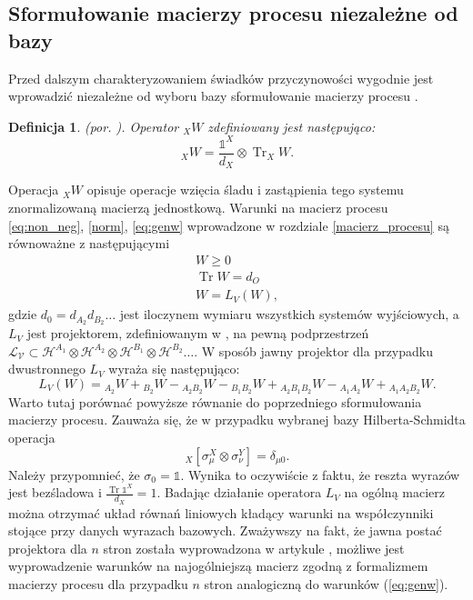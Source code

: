 \documentclass[10pt]{article} %
\newtheorem{definicja}{Definicja}
\DeclareMathOperator{\Trs}{Tr}
\newcommand{\Hx}[1]{\mathcal{H}^{#1}}
\newcommand{\I}{\mathbb{1}}
\begin{document}
\subsection{Sformułowanie macierzy procesu niezależne od bazy}
Przed dalszym charakteryzowaniem świadków przyczynowości wygodnie jest wprowadzić niezależne od wyboru bazy sformułowanie macierzy procesu \cite{causal_witness}.
\begin{definicja}
(por. \cite{causal_witness}).
Operator ${}_XW$ zdefiniowany jest następująco:
\begin{equation}
{}_X W = \frac{\I^X}{d_X} \otimes \Trs_X W.
\end{equation}
\end{definicja}
Operacja ${}_XW$ opisuje operacje wzięcia śladu i zastąpienia tego systemu znormalizowaną macierzą jednostkową.
Warunki na macierz procesu \eqref{eq:non_neg}, \eqref{norm}, \eqref{eq:genw} wprowadzone w rozdziale \ref{macierz_procesu} są równoważne z następującymi
\begin{gather}
W \geq 0 \\
\Trs W = d_O \\
W = L_V\left(W\right),
\end{gather}
gdzie $d_0 = d_{A_2} d_{B_2} \dots$ jest iloczynem wymiaru wszystkich systemów wyjściowych, a $L_V$ jest projektorem, zdefiniowanym w \cite{causal_witness}, na pewną podprzestrzeń 
$\mathcal{L_V} \subset \Hx{A_1} \otimes \Hx{A_2} \otimes \Hx{B_1} \otimes \Hx{B_2} \dots$.
W sposób jawny projektor dla przypadku dwustronnego $L_V$ wyraża się następująco:
\begin{equation}
\label{eq:projec2}
L_V(W) = {}_{A_2}W + {}_{B_2}W - {}_{A_2B_2}W - {}_{B_1B_2}W + {}_{A_2B_1B_2}W - {}_{A_1A_2}W + {}_{A_1A_2B_2}W.
\end{equation}
Warto tutaj porównać powyższe równanie do poprzedniego sformułowania macierzy procesu. Zauważa się, że w przypadku wybranej bazy Hilberta-Schmidta
operacja
\begin{equation}
{}_X\left[\sigma_\mu^X \otimes \sigma_\nu^Y\right] = \delta_{\mu0}.
\end{equation}
Należy przypomnieć, że $\sigma_0 = \I$.
Wynika to oczywiście z faktu, że reszta wyrazów jest bezśladowa i $\frac{\Trs \I^X}{d_X} = 1$. Badając działanie operatora $L_V$ na ogólną macierz można otrzymać układ równań liniowych kładący warunki na współczynniki stojące przy danych wyrazach bazowych. Zważywszy na fakt, że jawna postać projektora dla $n$ stron została wyprowadzona w artykule \cite{causal_witness}, możliwe jest wyprowadzenie warunków na najogólniejszą macierz zgodną z formalizmem macierzy procesu dla przypadku $n$ stron analogiczną do warunków (\ref{eq:genw}). 
\end{document}
